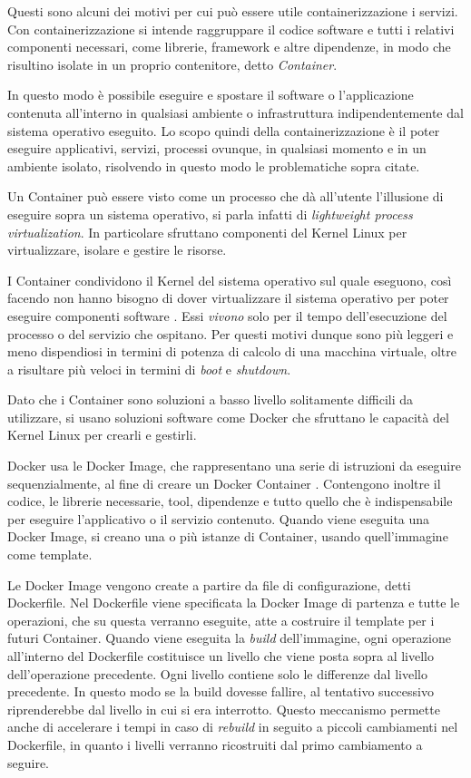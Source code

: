 Questi sono alcuni dei motivi per cui può essere utile containerizzazione i servizi.
Con containerizzazione si intende raggruppare  il codice software e tutti i relativi componenti necessari, come librerie, framework e altre dipendenze, in modo che risultino isolate in un proprio contenitore, detto \textit{Container}.

In questo modo è possibile eseguire e spostare il software o l'applicazione contenuta all'interno in qualsiasi ambiente o infrastruttura indipendentemente dal sistema operativo eseguito.
Lo scopo quindi della containerizzazione è il poter eseguire applicativi, servizi, processi ovunque, in qualsiasi momento e in un ambiente isolato, risolvendo in questo modo le problematiche sopra citate.

Un Container può essere visto come un processo che dà all'utente l'illusione di eseguire sopra un sistema operativo, si parla infatti di \textit{lightweight process virtualization}. In particolare sfruttano componenti del Kernel Linux per virtualizzare, isolare e gestire le risorse.

I Container condividono il Kernel del sistema operativo sul quale eseguono, così facendo non hanno bisogno di dover virtualizzare il sistema operativo per poter eseguire componenti software \cite{mouat2015using}.  
Essi \textit{vivono} solo per il tempo dell'esecuzione del processo o del servizio che ospitano.
Per questi motivi dunque sono  più leggeri e  meno dispendiosi in termini di potenza di calcolo di una macchina virtuale, oltre a risultare più veloci in termini di \textit{boot} e \textit{shutdown}.

Dato che i Container sono soluzioni a basso livello solitamente difficili da utilizzare, si usano soluzioni software come Docker  \cite{docker}  che sfruttano le capacità del Kernel Linux per crearli e gestirli.

Docker usa le Docker Image, che rappresentano una serie di istruzioni da eseguire sequenzialmente, al fine di creare un Docker Container \cite{mouat2015using}. Contengono inoltre il codice, le librerie necessarie, tool, dipendenze e tutto quello che è indispensabile per eseguire l'applicativo o il servizio contenuto. Quando viene eseguita una Docker Image, si creano una o più istanze di Container, usando quell'immagine come template.


Le Docker Image vengono create a partire da file di configurazione, detti Dockerfile. Nel Dockerfile viene specificata la Docker Image di partenza e tutte le operazioni, che su questa verranno eseguite, atte a costruire il template per i futuri Container. Quando viene eseguita la \textit{build} dell'immagine, ogni operazione all'interno del Dockerfile costituisce un livello che viene posta sopra al livello dell'operazione precedente. Ogni livello contiene solo le differenze dal livello precedente. In questo modo se la build dovesse fallire, al tentativo successivo riprenderebbe dal livello in cui si era interrotto. Questo meccanismo permette anche di accelerare i tempi in caso di \textit{rebuild} in seguito a piccoli cambiamenti nel Dockerfile, in quanto i livelli verranno ricostruiti dal primo cambiamento a seguire.

